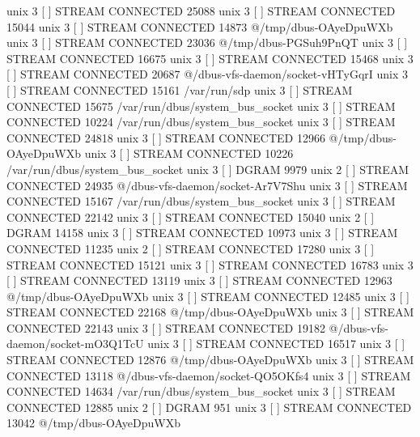 unix  3      [ ]         STREAM     CONNECTED     25088    
unix  3      [ ]         STREAM     CONNECTED     15044    
unix  3      [ ]         STREAM     CONNECTED     14873    @/tmp/dbus-OAyeDpuWXb
unix  3      [ ]         STREAM     CONNECTED     23036    @/tmp/dbus-PGSuh9PnQT
unix  3      [ ]         STREAM     CONNECTED     16675    
unix  3      [ ]         STREAM     CONNECTED     15468    
unix  3      [ ]         STREAM     CONNECTED     20687    @/dbus-vfs-daemon/socket-vHTyGqrI
unix  3      [ ]         STREAM     CONNECTED     15161    /var/run/sdp
unix  3      [ ]         STREAM     CONNECTED     15675    /var/run/dbus/system_bus_socket
unix  3      [ ]         STREAM     CONNECTED     10224    /var/run/dbus/system_bus_socket
unix  3      [ ]         STREAM     CONNECTED     24818    
unix  3      [ ]         STREAM     CONNECTED     12966    @/tmp/dbus-OAyeDpuWXb
unix  3      [ ]         STREAM     CONNECTED     10226    /var/run/dbus/system_bus_socket
unix  3      [ ]         DGRAM                    9979     
unix  2      [ ]         STREAM     CONNECTED     24935    @/dbus-vfs-daemon/socket-Ar7V7Shu
unix  3      [ ]         STREAM     CONNECTED     15167    /var/run/dbus/system_bus_socket
unix  3      [ ]         STREAM     CONNECTED     22142    
unix  3      [ ]         STREAM     CONNECTED     15040    
unix  2      [ ]         DGRAM                    14158    
unix  3      [ ]         STREAM     CONNECTED     10973    
unix  3      [ ]         STREAM     CONNECTED     11235    
unix  2      [ ]         STREAM     CONNECTED     17280    
unix  3      [ ]         STREAM     CONNECTED     15121    
unix  3      [ ]         STREAM     CONNECTED     16783    
unix  3      [ ]         STREAM     CONNECTED     13119    
unix  3      [ ]         STREAM     CONNECTED     12963    @/tmp/dbus-OAyeDpuWXb
unix  3      [ ]         STREAM     CONNECTED     12485    
unix  3      [ ]         STREAM     CONNECTED     22168    @/tmp/dbus-OAyeDpuWXb
unix  3      [ ]         STREAM     CONNECTED     22143    
unix  3      [ ]         STREAM     CONNECTED     19182    @/dbus-vfs-daemon/socket-mO3Q1TcU
unix  3      [ ]         STREAM     CONNECTED     16517    
unix  3      [ ]         STREAM     CONNECTED     12876    @/tmp/dbus-OAyeDpuWXb
unix  3      [ ]         STREAM     CONNECTED     13118    @/dbus-vfs-daemon/socket-QO5OKfs4
unix  3      [ ]         STREAM     CONNECTED     14634    /var/run/dbus/system_bus_socket
unix  3      [ ]         STREAM     CONNECTED     12885    
unix  2      [ ]         DGRAM                    951      
unix  3      [ ]         STREAM     CONNECTED     13042    @/tmp/dbus-OAyeDpuWXb
